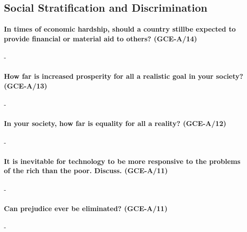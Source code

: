 \documentclass[../../main]{subfiles}
\begin{document}
\subsection{Social Stratification and Discrimination}

\paragraph{In times of economic hardship, should a country stillbe expected to provide financial or material aid to others? (GCE-A/14)}-

\paragraph{How far is increased prosperity for all a realistic goal in your society? (GCE-A/13)}-

\paragraph{In your society, how far is equality for all a reality? (GCE-A/12)}-

\paragraph{It is inevitable for technology to be more responsive to the problems of the rich than the poor. Discuss. (GCE-A/11)}-

\paragraph{Can prejudice ever be eliminated? (GCE-A/11)}-
\end{document}
